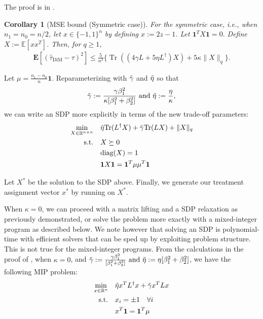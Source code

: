 \documentclass[12pt]{article}
\newtheorem{corollary}[theorem]{Corollary}
\theoremstyle{definition}
\numberwithin{equation}{section}
\numberwithin{figure}{section}
\numberwithin{equation}{section}
\numberwithin{figure}{section}
\begin{document}
The proof is in .

\begin{corollary}[MSE bound (Symmetric case)] \label{thm:mse_bound_dim_symmetric}
For the symmetric case, i.e., when $n_1 = n_0 = n/2$, let $x \in \{-1, 1\}^n$ by defining $x := 2z-1$. Let $\mathbf{1}^T X \mathbf{1} = 0.$ Define $X := \mathbb{E}[xx^T]$. Then, for $q \geq 1$,
\begin{align*}
\mathbf{E}[(\hat{\tau}_{\text{DiM}} - \tau)^2] \leq \frac{5}{n^2} \{ \operatorname{Tr}((4\gamma L + 5\eta L^\dagger) X) + 5\kappa\|X\|_{q} \}.
\end{align*}
\end{corollary}


Let $\mu = \frac{n_1 - n_0}{n} \mathbf{1}$. Reparameterizing with $\Tilde{\gamma}$ and $\Tilde{\eta}$ so that
\begin{align*}
    \Tilde{\gamma} := \frac{\gamma \beta_1^2}{\kappa[\beta_1^2 + \beta_2^2]} \text{ and } \Tilde{\eta} := \frac{\eta}{\kappa},
\end{align*} we can write an SDP more explicitly in terms of the new trade-off parameters:
\begin{align} \label{sdp_relaxation_mse_p_norm_dim}
    \min_{X\in\mathbb{R}^{n\times n}} \quad & \Tilde{\eta}\text{Tr}(L^\dagger X)  +   \Tilde{\gamma} \text{Tr}(L X) + \|X\|_{q} \\
    \text{s.t.} \quad & X \succeq  0 \notag\\
    & \text{diag}(X) = 1 \notag \\
    & \mathbf{1}X\mathbf{1} = \mathbf{1}^T \mu \mu^T \mathbf{1} \notag
\end{align}

Let $X^*$ be the solution to the SDP above. Finally, we generate our treatment assignment vector $x^*$ by running  on $X^*$.

\begin{remark} \label{section_MIP} 
When $\kappa = 0$,  we can proceed with a matrix lifting and a SDP relaxation as previously demonstrated, or solve the problem more exactly with a mixed-integer program as described below. We note however that solving an SDP is polynomial-time with efficient solvers that can be sped up by exploiting problem structure. This is not true for the mixed-integer programs.
From the calculations in the proof of , when $\kappa =0$, and $\Tilde{\gamma} := \frac{\gamma \beta_1^2}{[\beta_1^2 + \beta_2^2]} \text{ and } \Tilde{\eta} := \eta [\beta_1^2 + \beta_2^2]$, we have the following MIP problem:
\begin{align}
\label{integer_program}
    \min_{x \in \mathbb{R}^n}  \quad & \Tilde{\eta} x^TL^{\dagger}x  + \Tilde{\gamma} x^T L x \\
    \text{s.t.} \quad & x_i = \pm 1 \quad \forall i \\
    & x^T \mathbf{1} = \mathbf{1}^T \mu 
\end{align}
\end{remark}
\end{document}

